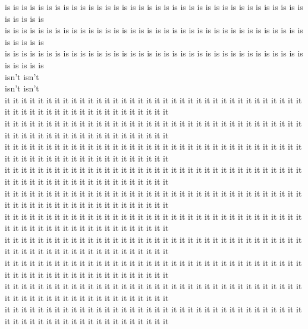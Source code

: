 is is is is is is is is is is is is is is is is is is is is is is is is is is is is is is is is is is is is is is is is is\\
is is is is is is is is is is is is is is is is is is is is is is is is is is is is is is is is is is is is is is is is is\\
is is is is is is is is is is is is is is is is is is is is is is is is is is is is is is is is is is is is is is is is is\\
isn't isn't\\
isn't isn't\\
it it it it it it it it it it it it it it it it it it it it it it it it it it it it it it it it it it it it it it it it it it it it it it it it it it it it it it it it\\
it it it it it it it it it it it it it it it it it it it it it it it it it it it it it it it it it it it it it it it it it it it it it it it it it it it it it it it it\\
it it it it it it it it it it it it it it it it it it it it it it it it it it it it it it it it it it it it it it it it it it it it it it it it it it it it it it it it\\
it it it it it it it it it it it it it it it it it it it it it it it it it it it it it it it it it it it it it it it it it it it it it it it it it it it it it it it it\\
it it it it it it it it it it it it it it it it it it it it it it it it it it it it it it it it it it it it it it it it it it it it it it it it it it it it it it it it\\
it it it it it it it it it it it it it it it it it it it it it it it it it it it it it it it it it it it it it it it it it it it it it it it it it it it it it it it it\\
it it it it it it it it it it it it it it it it it it it it it it it it it it it it it it it it it it it it it it it it it it it it it it it it it it it it it it it it\\
it it it it it it it it it it it it it it it it it it it it it it it it it it it it it it it it it it it it it it it it it it it it it it it it it it it it it it it it\\
it it it it it it it it it it it it it it it it it it it it it it it it it it it it it it it it it it it it it it it it it it it it it it it it it it it it it it it it\\
it it it it it it it it it it it it it it it it it it it it it it it it it it it it it it it it it it it it it it it it it it it it it it it it it it it it it it it it\\
